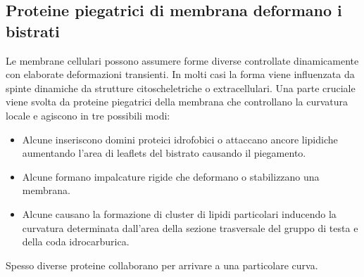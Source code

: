 \subsection{Proteine piegatrici di membrana deformano i bistrati}
Le membrane cellulari possono assumere forme diverse controllate dinamicamente con elaborate deformazioni transienti. In molti casi la forma viene influenzata da spinte dinamiche da
strutture citoscheletriche o extracellulari. Una parte cruciale viene svolta da proteine piegatrici della membrana che controllano la curvatura locale e agiscono in tre possibili modi:
\begin{itemize}
	\item Alcune inseriscono domini proteici idrofobici o attaccano ancore lipidiche aumentando l'area di leaflets del bistrato causando il piegamento. 
	\item Alcune formano impalcature rigide che deformano o stabilizzano una membrana.
	\item Alcune causano la formazione di cluster di lipidi particolari inducendo la curvatura determinata dall'area della sezione trasversale del gruppo di testa e della coda
		idrocarburica. 
\end{itemize}
Spesso diverse proteine collaborano per arrivare a una particolare curva.

